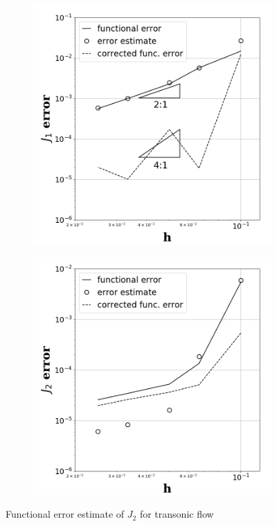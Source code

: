 \documentclass[a4paper]{article}
\begin{document}
\begin{figure}[!htbp]
  \centering
  \centering
  \begin{subfigure}{0.45\textwidth}
    \centering
    \includegraphics[width=1.0\linewidth]{figures/transonic_p1_J2.png}
    \label{fig:transonic_p1_j2}
  \end{subfigure}
  \begin{subfigure}{0.45\textwidth}
    \centering
    \includegraphics[width=1.0\linewidth]{figures/transonic_p2_J2.png}
    \label{fig:transonic_p2_j2}
  \end{subfigure}
  \caption{Functional error estimate of $J_2$ for transonic flow}
  \label{fig:tran_func_error_J2}
\end{figure}
\end{document}
